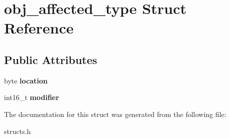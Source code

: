 \hypertarget{structobj__affected__type}{}\section{obj\+\_\+affected\+\_\+type Struct Reference}
\label{structobj__affected__type}
\subsection*{Public Attributes}
\begin{DoxyCompactItemize}
\item 
\mbox{\label{structobj__affected__type_a2519267847de698ce42c29b0e3885a4c}} 
byte {\bfseries location}
\item 
\mbox{\label{structobj__affected__type_ad8b795f2f732286fb0e344e7fe0a1623}} 
int16\+\_\+t {\bfseries modifier}
\end{DoxyCompactItemize}


The documentation for this struct was generated from the following file\+:\begin{DoxyCompactItemize}
\item 
structs.\+h\end{DoxyCompactItemize}
